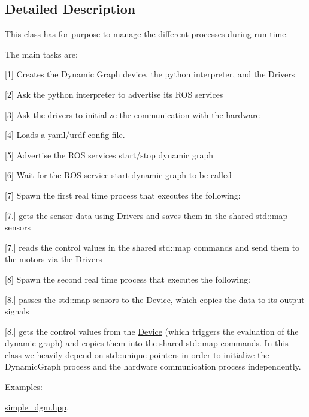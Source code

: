 \subsection{Detailed Description}
This class has for purpose to manage the different processes during run time. 

The main tasks are\+:
\begin{DoxyItemize}
\item \mbox{[}1\mbox{]} Creates the Dynamic Graph device, the python interpreter, and the Drivers
\item \mbox{[}2\mbox{]} Ask the python interpreter to advertise its R\+OS services
\item \mbox{[}3\mbox{]} Ask the drivers to initialize the communication with the hardware
\item \mbox{[}4\mbox{]} Loads a yaml/urdf config file.
\item \mbox{[}5\mbox{]} Advertise the R\+OS services start/stop dynamic graph
\item \mbox{[}6\mbox{]} Wait for the R\+OS service start dynamic graph to be called
\item \mbox{[}7\mbox{]} Spawn the first real time process that executes the following\+:
\begin{DoxyItemize}
\item \mbox{[}7.\mbox{]} gets the sensor data using Drivers and saves them in the shared std\+::map sensors
\item \mbox{[}7.\mbox{]} reads the control values in the shared std\+::map commands and send them to the motors via the Drivers
\end{DoxyItemize}
\item \mbox{[}8\mbox{]} Spawn the second real time process that executes the following\+:
\begin{DoxyItemize}
\item \mbox{[}8.\mbox{]} passes the std\+::map sensors to the \hyperlink{classdynamic__graph_1_1Device}{Device}, which copies the data to its output signals
\item \mbox{[}8.\mbox{]} gets the control values from the \hyperlink{classdynamic__graph_1_1Device}{Device} (which triggers the evaluation of the dynamic graph) and copies them into the shared std\+::map commands. In this class we heavily depend on std\+::unique pointers in order to initialize the Dynamic\+Graph process and the hardware communication process independently. 
\end{DoxyItemize}
\end{DoxyItemize}\begin{Desc}
\item[Examples\+: ]\par
\hyperlink{simple_dgm_8hpp-example}{simple\+\_\+dgm.\+hpp}.\end{Desc}


